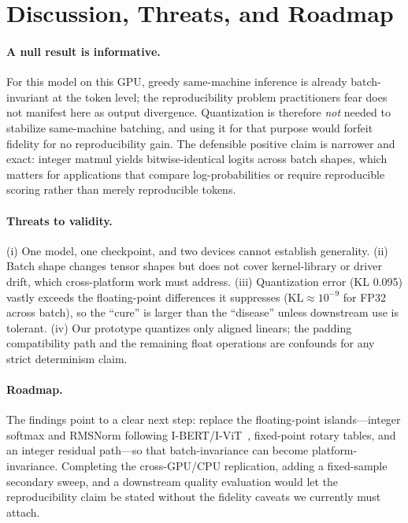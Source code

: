 \documentclass[10pt,twocolumn]{article}
\begin{document}
\section{Discussion, Threats, and Roadmap}
\paragraph{A null result is informative.} For this model on this GPU, greedy
same-machine inference is already batch-invariant at the token level; the
reproducibility problem practitioners fear does not manifest here as output
divergence. Quantization is therefore \emph{not} needed to stabilize
same-machine batching, and using it for that purpose would forfeit fidelity for no
reproducibility gain. The defensible positive claim is narrower and exact:
integer matmul yields bitwise-identical logits across batch shapes, which matters
for applications that compare log-probabilities or require reproducible scoring
rather than merely reproducible tokens.

\paragraph{Threats to validity.} (i) One model, one checkpoint, and two devices
cannot establish generality. (ii) Batch shape changes tensor shapes but does not
cover kernel-library or driver drift, which cross-platform work must address.
(iii) Quantization error (KL 0.095) vastly exceeds the floating-point differences
it suppresses ($\text{KL}\!\approx\!10^{-9}$ for FP32 across batch), so the
``cure'' is larger than the ``disease'' unless downstream use is tolerant. (iv)
Our prototype quantizes only aligned linears; the padding compatibility path and
the remaining float operations are confounds for any strict determinism claim.

\paragraph{Roadmap.} The findings point to a clear next step: replace the
floating-point islands---integer softmax and RMSNorm following
I-BERT/I-ViT~\cite{kim2021ibert,li2023ivit}, fixed-point rotary tables, and an
integer residual path---so that batch-invariance can become platform-invariance.
Completing the cross-GPU/CPU replication, adding a fixed-sample secondary sweep,
and a downstream quality evaluation would let the reproducibility claim be stated
without the fidelity caveats we currently must attach.
\end{document}
